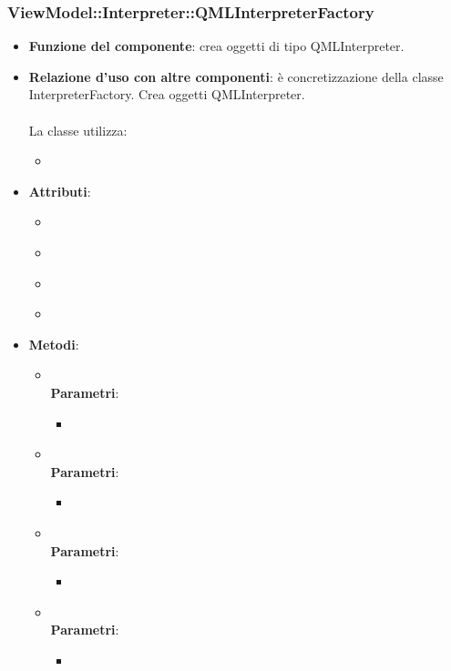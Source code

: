 \subsubsection{ViewModel::Interpreter::QMLInterpreterFactory}
\begin{itemize}
\item\textbf{Funzione del componente}: crea oggetti di tipo QMLInterpreter.
	\item\textbf{Relazione d'uso con altre componenti}: è concretizzazione della classe InterpreterFactory. Crea oggetti QMLInterpreter.\\ \\
La classe utilizza:
	\begin{itemize}
		\item
	\end{itemize}
\item\textbf{Attributi}:
	\begin{itemize}
		\item\code{}\\
		\item\code{}\\
		\item\code{}\\
		\item\code{}\\
	\end{itemize}
\item\textbf{Metodi}:
	\begin{itemize}
		\item\code{}\\
		\textbf{Parametri}:
			\begin{itemize}
				\item\code{}\\
			\end{itemize}
		\item\code{}\\
		\textbf{Parametri}:
			\begin{itemize}
				\item\code{}\\
			\end{itemize}
		\item\code{}\\
		\textbf{Parametri}:
			\begin{itemize}
				\item\code{}\\
			\end{itemize}
		\item\code{}\\
		\textbf{Parametri}:
			\begin{itemize}
				\item\code{}\\
			\end{itemize}
	\end{itemize}
\end{itemize}

